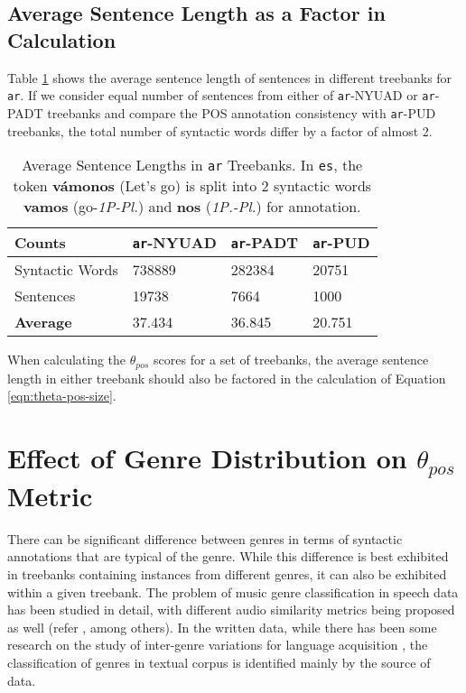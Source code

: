 \subsection{Average Sentence Length as a Factor in Calculation}

Table \ref{tab:counts-ar} shows the average sentence length of sentences in different treebanks for \verb|ar|. If we consider equal number of sentences from either of \verb|ar|-NYUAD or \verb|ar|-PADT treebanks and compare the POS annotation consistency with \verb|ar|-PUD treebanks, the total number of syntactic words differ by a factor of almost 2. 

\begin{table}[H]
    \centering
    \begin{tabular}{|l|l|l|l|}
    \hline
    \textbf{Counts} & \texttt{ar}-NYUAD & \texttt{ar}-PADT & \texttt{ar}-PUD \\
    \hline
    Syntactic Words & 738889 & 282384 & 20751 \\
    Sentences & 19738 & 7664 & 1000\\
    \hline
    \textbf{Average} & 37.434 & 36.845 & 20.751\\
    \hline
    \end{tabular}
    \caption[Average Sentence Lengths in \texttt{ar} Treebanks]{Average Sentence Lengths in \texttt{ar} Treebanks. In \texttt{es}, the token \textbf{v\'amonos} (Let's go) is split into 2 syntactic words \textbf{vamos} (go-\textit{1P-Pl.}) and \textbf{nos} (\textit{1P.-Pl.}) for annotation.}
    \label{tab:counts-ar}
\end{table}

When calculating the \(\theta_{pos}\) scores for a set of treebanks, the average sentence length in either treebank should also be factored in the calculation of Equation \ref{eqn:theta-pos-size}.

\section{Effect of Genre Distribution on \(\theta_{pos}\) Metric}
\label{sec:pos-harmony-genre}

There can be significant difference between genres in terms of syntactic annotations that are typical of the genre. While this difference is best exhibited in treebanks containing instances from different genres, it can also be exhibited within a given treebank. The problem of music genre classification in speech data has been studied in detail, with different audio similarity metrics being proposed as well (refer \cite{music1, music2}, among others). In the written data, while there has been some research on the study of inter-genre variations for language acquisition \citep{genre-acquisition1}, the classification of genres in textual corpus is identified mainly by the source of data.

